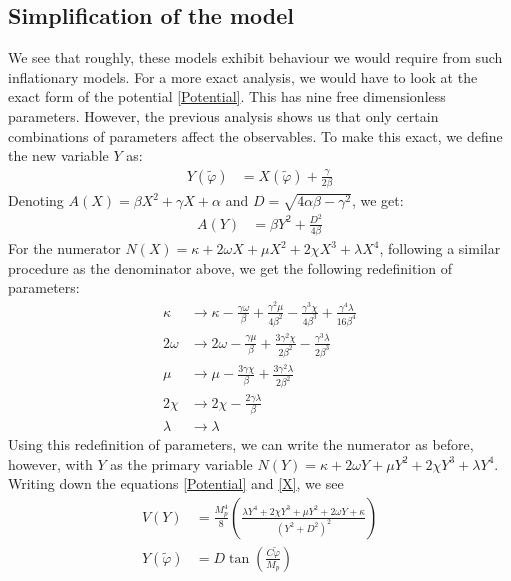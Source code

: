 \documentclass[aps,prd,reprint,preprintnumbers,showpacs,floatfix,nofootinbib,superscript address]{revtex4-2}
\begin{document}
\subsection{Simplification of the model} \label{Reduction of parameters}
We see that roughly, these models exhibit behaviour we would require from such inflationary models. For a more exact analysis, we would have to look at the exact form of the potential \ref{Potential}. This has nine free dimensionless parameters. However, the previous analysis shows us that only certain combinations of parameters affect the observables. To make this exact, we define the new variable $Y$ as:
\begin{align}
    Y(\tilde{\varphi}) &= X(\tilde{\varphi}) + \frac{\gamma}{2\beta}
\end{align}
Denoting $A(X) = \beta X^2 + \gamma X + \alpha$ and $D = \sqrt{4\alpha\beta-\gamma^2}$, we get:
\begin{align}
    A(Y) &= \beta Y^2 + \frac{D^2}{4\beta} \nonumber
\end{align}
For the numerator $N(X) = \kappa + 2\omega X +\mu X^2 + 2\chi X^3 + \lambda X^4$, following a similar procedure as the denominator above, we get the following redefinition of parameters: 
\begin{align}
    \kappa &\rightarrow \kappa - \frac{\gamma\omega}{\beta} + \frac{\gamma^2\mu}{4\beta^2} - \frac{\gamma^3\chi}{4\beta^3} +\frac{\gamma^4\lambda}{16\beta^4}    \nonumber \\
    2\omega &\rightarrow 2\omega - \frac{\gamma\mu}{\beta} + \frac{3\gamma^2\chi}{2\beta^2} - \frac{\gamma^3\lambda}{2\beta^3}   \nonumber \\
    \mu &\rightarrow \mu - \frac{3\gamma\chi}{\beta} + \frac{3\gamma^2\lambda}{2\beta^2} \nonumber \\
    2\chi &\rightarrow 2\chi - \frac{2\gamma\lambda}{\beta} \nonumber \\
    \lambda &\rightarrow \lambda \label{huge redefiniton}
\end{align}
Using this redefinition of parameters, we can write the numerator as before, however, with $Y$ as the primary variable $N(Y) = \kappa + 2\omega Y +\mu Y^2 + 2\chi Y^3 + \lambda Y^4$. Writing down the equations \ref{Potential} and \ref{X}, we see
\begin{align}
    V(Y) &= \frac{M_p^4}{8} \left(\frac{\lambda Y^4 + 2 \chi Y^3 + \mu Y^2  + 2\omega Y + \kappa}{(Y^2 + D^2)^2} \right) \nonumber \\
    Y(\tilde{\varphi}) &= D \tan \left(\frac{C \tilde{\varphi}}{M_p} \right) \nonumber
\end{align}
\end{document}
